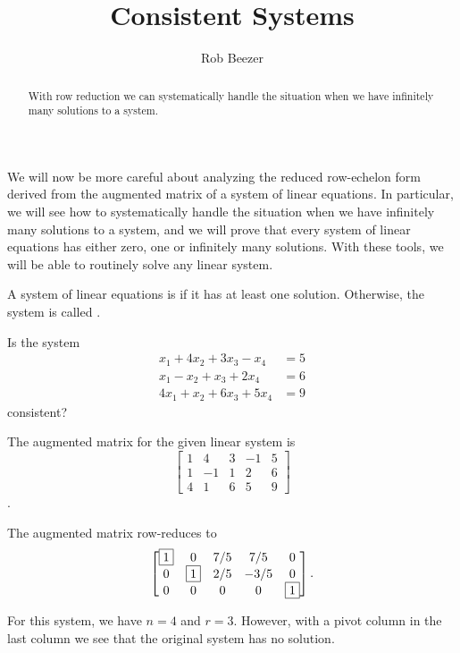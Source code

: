 \documentclass{ximera}
\author{Rob Beezer}
\title{Consistent Systems}
\begin{document}
\begin{abstract}
  With row reduction we can systematically handle the situation when we
  have infinitely many solutions to a system.
\end{abstract}
\maketitle

We will now be more careful about analyzing the reduced row-echelon form derived from the  augmented matrix of a system of linear equations.    In particular, we will see how to systematically handle the situation when we have infinitely many solutions to a system, and we will prove that every system of linear equations has either zero, one or infinitely many solutions.  With these tools, we will be able to routinely solve any linear system.

\begin{definition}
\label{definition:CS}
A system of linear equations is  if it has at least one solution.  Otherwise, the system is called .
\end{definition}

\begin{exercise}
  Is the system
  \begin{align*}
    x_1 + 4x_2 + 3x_3 - x_4 &= 5\\
    x_1 - x_2 + x_3 + 2x_4 &= 6\\
    4x_1 + x_2 + 6x_3 + 5x_4 &= 9
  \end{align*}
  consistent?

  \begin{multipleChoice}
  \end{multipleChoice}

  \begin{hint}
    The augmented matrix for the given linear system is
    \[
      \begin{bmatrix}
        1 & 4 & 3 & -1 & 5\\
        1 & -1 & 1 & 2 & 6\\
        4 & 1 & 6 & 5 & 9
      \end{bmatrix}
    \].
  \end{hint}

  \begin{hint}
    The augmented matrix row-reduces to
    \[\begin{bmatrix}
        \fbox{1} & 0 & 7/5 & 7/5 & 0\\
        0 & \fbox{1} & 2/5 & -3/5 & 0\\
        0 & 0 & 0 & 0 & \fbox{1}
      \end{bmatrix}.\]
  \end{hint}

  \begin{hint}
    For this system, we have $n = 4$ and $r = 3$.  However, with a
    pivot column in the last column we see that the original system
    has no solution.
  \end{hint}
\end{exercise}
\end{document}

